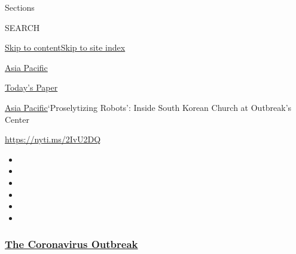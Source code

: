 Sections

SEARCH

\protect\hyperlink{site-content}{Skip to
content}\protect\hyperlink{site-index}{Skip to site index}

\href{https://www.nytimes3xbfgragh.onion/section/world/asia}{Asia
Pacific}

\href{https://myaccount.nytimes3xbfgragh.onion/auth/login?response_type=cookie\&client_id=vi}{}

\href{https://www.nytimes3xbfgragh.onion/section/todayspaper}{Today's
Paper}

\href{/section/world/asia}{Asia Pacific}\textbar{}`Proselytizing
Robots': Inside South Korean Church at Outbreak's Center

\url{https://nyti.ms/2IvU2DQ}

\begin{itemize}
\item
\item
\item
\item
\item
\item
\end{itemize}

\hypertarget{the-coronavirus-outbreak}{%
\subsubsection{\texorpdfstring{\href{https://www.nytimes3xbfgragh.onion/news-event/coronavirus?name=styln-coronavirus-national\&region=TOP_BANNER\&block=storyline_menu_recirc\&action=click\&pgtype=Article\&impression_id=214bd4e0-f52e-11ea-aca2-5fcae7f3caf4\&variant=undefined}{The
Coronavirus
Outbreak}}{The Coronavirus Outbreak}}\label{the-coronavirus-outbreak}}

